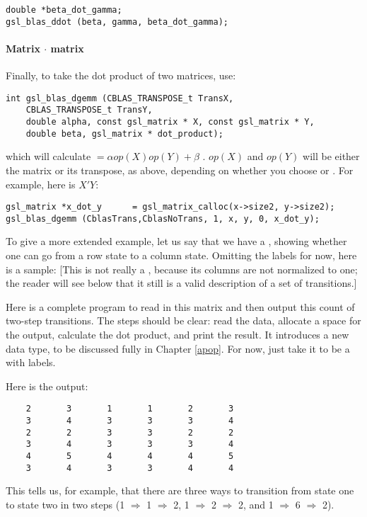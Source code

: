 \begin{lstlisting}
double *beta_dot_gamma;
gsl_blas_ddot (beta, gamma, beta_dot_gamma);
\end{lstlisting}

\paragraph{Matrix $\cdot$ matrix}
Finally, to take the dot product of two matrices, use:
\begin{lstlisting}
int gsl_blas_dgemm (CBLAS_TRANSPOSE_t TransX, 
    CBLAS_TRANSPOSE_t TransY, 
    double alpha, const gsl_matrix * X, const gsl_matrix * Y, 
    double beta, gsl_matrix * dot_product);
\end{lstlisting}
which will calculate  $= \alpha op(X) op(Y) + \beta$ . $op(X)$ and
$op(Y)$ will be either the matrix or its transpose, as above, depending on whether you choose 
or . For example, here is $X'Y$:

\begin{lstlisting}
gsl_matrix *x_dot_y      = gsl_matrix_calloc(x->size2, y->size2);
gsl_blas_dgemm (CblasTrans,CblasNoTrans, 1, x, y, 0, x_dot_y);
\end{lstlisting}

To give a more extended example, let us say that we have a , showing whether one can go from a row state to a
column state. Omitting the labels for now, here is a sample:
\label{twostep} 
[This is not really a , because its
columns are not normalized to one; the reader will see below that it
still is a valid description of a set of transitions.]

Here is a complete program to read in this matrix and then output this
count of two-step transitions. The steps should be clear: read the data,
allocate a space for the output, calculate the dot product, and print
the result. It introduces a new data type,  to be
discussed fully in Chapter \ref{apop}. For now, just take it to be a
 with labels.

Here is the output:
\begin{lstlisting}
    2       3       1       1       2       3
    3       4       3       3       3       4
    2       2       3       3       2       2
    3       4       3       3       3       4
    4       5       4       4       4       5
    3       4       3       3       4       4
\end{lstlisting}
This tells us, for example, that there are three ways to transition from state one to
state two in two steps (1 $\Rightarrow$ 1 $\Rightarrow$ 2, 
1 $\Rightarrow$ 2 $\Rightarrow$ 2,  and 1 $\Rightarrow$ 6 $\Rightarrow$
2).

